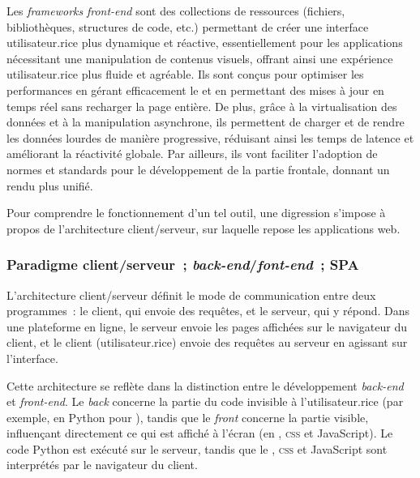 Les \textit{frameworks} \textit{front-end} sont des collections de ressources (fichiers,
bibliothèques, structures de code, etc.) permettant de créer une
interface utilisateur.rice plus dynamique et réactive, essentiellement pour
les applications nécessitant une manipulation de contenus visuels,
offrant ainsi une expérience utilisateur.rice plus fluide et agréable. Ils
sont conçus pour optimiser les performances en gérant efficacement le
\dom et en permettant des mises à jour en temps réel sans recharger la
page entière. De plus, grâce à la virtualisation des données et à la
manipulation asynchrone, ils permettent de charger et de rendre les
données lourdes de manière progressive, réduisant ainsi les temps de
latence et améliorant la réactivité globale. Par ailleurs, ils vont
faciliter l'adoption de normes et standards pour le développement de la
partie frontale, donnant un rendu plus unifié.

Pour comprendre le fonctionnement d'un tel outil, une digression
s'impose à propos de l'architecture client/serveur, sur laquelle repose les
applications web.

\hypertarget{paradigme-clientserveur-back-endfont-end-spa}{%
\subsubsection{Paradigme client/serveur~; \emph{back-end}/\emph{font-end}~;
SPA}\label{paradigme-clientserveur-back-endfont-end-spa}}

L'architecture client/serveur définit le mode de communication entre
deux programmes~: le client, qui envoie des requêtes, et le serveur, qui
y répond. Dans une plateforme en ligne, le serveur envoie les pages
affichées sur le navigateur du client, et le client (utilisateur.rice) envoie
des requêtes au serveur en agissant sur l'interface.

Cette architecture se reflète dans la distinction entre le développement
\textit{back-end} et \textit{front-end}. Le \textit{back} concerne la partie du code invisible à
l'utilisateur.rice (par exemple, en Python pour \eida), tandis que le \textit{front}
concerne la partie visible, influençant directement ce qui est affiché à
l'écran (en \html, \textsc{css} et JavaScript). Le code Python est exécuté sur le
serveur, tandis que le \html, \textsc{css} et JavaScript sont interprétés par le
navigateur du client.

